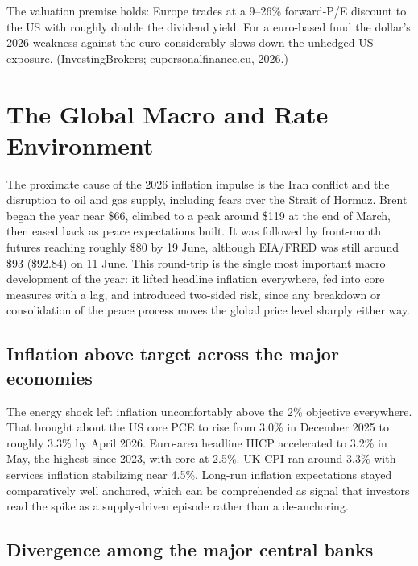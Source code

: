 \documentclass[11pt,a4paper]{article}
\begin{document}
The valuation premise holds: Europe trades at a 9--26\% forward-P/E discount to the US with roughly double the dividend yield. For a euro-based fund the dollar's 2026 weakness against the euro considerably slows down the unhedged US exposure. (InvestingBrokers; eupersonalfinance.eu, 2026.)

\section{The Global Macro and Rate Environment}

The proximate cause of the 2026 inflation impulse is the Iran conflict and the disruption to oil and gas supply, including fears over the Strait of Hormuz. Brent began the year near \$66, climbed to a peak around \$119 at the end of March, then eased back as peace expectations built. It was followed by front-month futures reaching roughly \$80 by 19 June, although EIA/FRED was still around \$93 (\$92.84) on 11 June. This round-trip is the single most important macro development of the year: it lifted headline inflation everywhere, fed into core measures with a lag, and introduced two-sided risk, since any breakdown or consolidation of the peace process moves the global price level sharply either way.


\subsection{Inflation above target across the major economies}

The energy shock left inflation uncomfortably above the 2\% objective everywhere. That brought about the US core PCE to rise from 3.0\% in December 2025 to roughly 3.3\% by April 2026. Euro-area headline HICP accelerated to 3.2\% in May, the highest since 2023, with core at 2.5\%. UK CPI ran around 3.3\% with services inflation stabilizing near 4.5\%. Long-run inflation expectations stayed comparatively well anchored, which can be comprehended as signal that investors read the spike as a supply-driven episode rather than a de-anchoring.


\subsection{Divergence among the major central banks}
\end{document}
